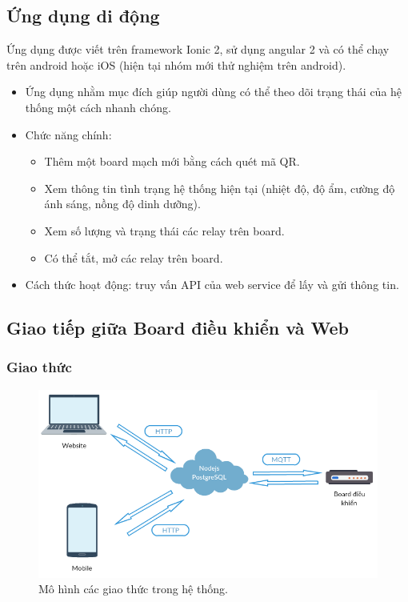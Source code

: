 \documentclass[a4paper,12pt,oneside]{article}
\begin{document}
\subsection{Ứng dụng di động}
\noindent Ứng dụng được viết trên framework Ionic 2, sử dụng angular 2 và có thể chạy trên android hoặc iOS (hiện tại nhóm mới thử nghiệm trên android). 
\begin{itemize}
\item Ứng dụng nhằm mục đích giúp người dùng có thể theo dõi trạng thái của hệ thống một cách nhanh chóng.
\item Chức năng chính:
\begin{itemize}
\item Thêm một board mạch mới bằng cách quét mã QR. 
\item Xem thông tin tình trạng hệ thống hiện tại (nhiệt độ, độ ẩm, cường độ ánh sáng, nồng độ dinh dưỡng).
\item Xem số lượng và trạng thái các relay trên board. 
\item Có thể tắt, mở các relay trên board.
\end{itemize}
\item Cách thức hoạt động: truy vấn API của web service để lấy và gửi thông tin.
\end{itemize}

\subsection{Giao tiếp giữa Board điều khiển và Web}
\subsubsection{Giao thức}

\begin{figure}[H]
	\centering
	\includegraphics[scale=.5]{hinh/system-protocol.png}
	\caption{Mô hình các giao thức trong hệ thống.}
\end{figure}
\end{document}
